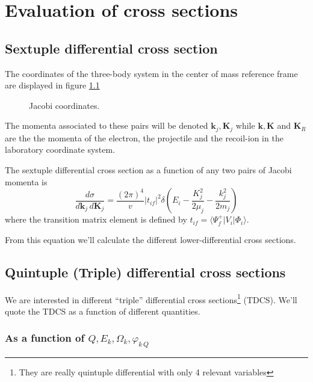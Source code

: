 \chapter{Evaluation of cross sections}
\label{C:txs}


\section{Sextuple differential cross section}
The coordinates of the three-body system in the center of mass
reference frame are displayed in figure \ref{f:jacobi}
%
\begin{figure}[!htb]
    \centering
\vspace{.5cm}
\caption{Jacobi coordinates. \label{f:jacobi}}
\end{figure}

The momenta associated to these pairs will be denoted
$\bm{k}_{j},\bm{K}_{j}$ while $\bm{k}, \bm{K}$ and $\bm{K}_{R}$ are the
the momenta of the electron, the projectile and the recoil-ion in the
laboratory coordinate system.

The sextuple differential cross section as a function of any two pairs
of Jacobi momenta is
%
\begin{equation}\label{Q:TDCS}
\frac{d \sigma}{d \bm{k}_{j} \, d \bm{K}_{j}} = \frac{(2
\pi)^{4}}{v} | t_{if}| ^{2} \delta \left( E_{i} -
\frac{K_{j}^{2}} {2 \mu_{j}} - \frac{k_{j}^{2}}{2 m_{j}}\right)
\end{equation}
%
where the transition matrix element is defined by $t_{if} = \langle
\Psi^{+}_{f} | V_{i} |  \Phi_{i} \rangle$.

From this equation we'll calculate the different lower-differential
cross sections.

\section{Quintuple (Triple) differential cross sections}

We are interested in different ``triple'' differential cross
sections\footnote{They are really quintuple differential with only 4
relevant variables} (TDCS). We'll quote the TDCS as a function of
different quantities.

\subsection{As a function of $Q,E_{k},\Omega_{k},
\varphi_{k\,Q}$}

